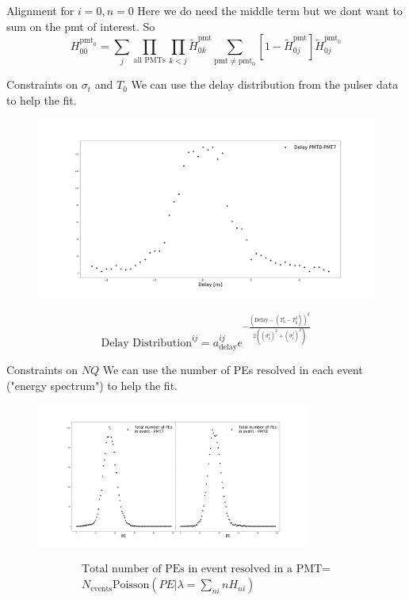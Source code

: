 \documentclass{beamer}
\begin{document}
\begin{frame}{Alignment for $i=0, n=0$}
Here we do need the middle term but we dont want to sum on the pmt of interest. So
\begin{equation}
H_{00}^{\text{pmt}_0}=\sum_j\prod_{\text{all PMTs}}\prod_{k<j}\tilde{H}_{0k}^{\text{pmt}}\sum_{\text{pmt}\neq\text{pmt}_0}[1-\tilde{H}_{0j}^{\text{pmt}}]\tilde{H}_{0j}^{\text{pmt}_0}
\end{equation}
\end{frame}

\begin{frame}{Constraints on $\sigma_t$ and $T_0$}
We can use the delay distribution from the pulser data to help the fit.
\begin{figure}[h]
\includegraphics[width=1\textwidth]{model_delay.png}
\end{figure}
\begin{equation}
\text{Delay Distribution}^{ij}=a_{\text{delay}}^{ij}e^{-\frac{\left(\text{Delay}-(T_0^i-T_0^j)\right)^2}{2\left((\sigma_t^i)^2+(\sigma_t^j)^2\right)}}
\end{equation}
\end{frame}

\begin{frame}{Constraints on $NQ$}
We can use the number of PEs resolved in each event ("energy spectrum") to help the fit.
\begin{figure}[h]
\includegraphics[width=0.8\textwidth]{totalPE.png}
\end{figure}
\begin{equation}
\begin{split}
\text{Total number of PEs in event resolved in a PMT}=\\
N_{\text{events}}\text{Poisson}\left(PE|\lambda=\sum_{ni}nH_{ni}\right)
\end{split}
\end{equation}
\end{frame}
\end{document}
